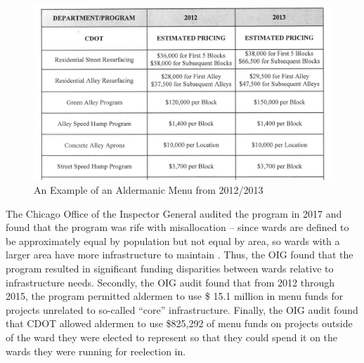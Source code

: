 \begin{figure}[H]
    \centering
    \caption{An Example of an Aldermanic Menu from 2012/2013}\label{fig:menu_example}
    \includegraphics[scale=0.38]{input/menu_example.png}
\end{figure}

The Chicago Office of the Inspector General audited the program in 2017 and found that the program was rife with misallocation -- since wards are defined to be approximately equal by population but not equal by area, so wards with a larger area have more infrastructure to maintain \cite{OIGaudit}.
Thus, the OIG found that the program resulted in significant funding disparities between wards relative to infrastructure needs.
Secondly, the OIG audit found that from 2012 through 2015, the program permitted aldermen to use \$ 15.1 million in menu funds for projects unrelated to so-called ``core'' infrastructure.
Finally, the OIG audit found that CDOT allowed aldermen to use \$825,292 of menu funds on projects outside of the ward they were elected to represent so that they could spend it on the wards they were running for reelection in.
